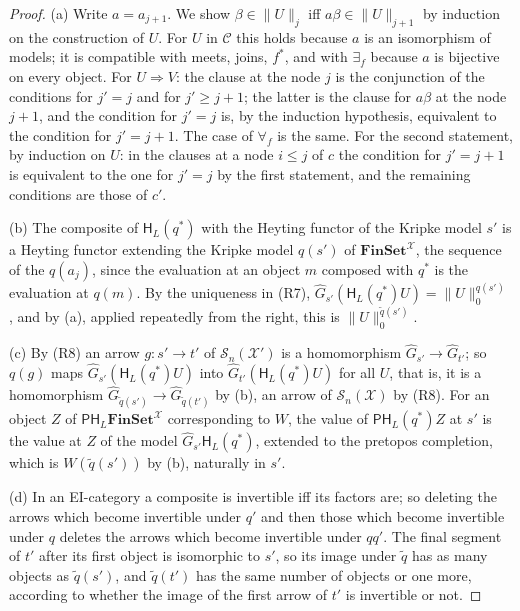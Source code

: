 \documentclass[11pt]{amsart}
\theoremstyle{definition}
\newcommand{\Fin}{\mathbf{FinSet}}
\newcommand{\PP}{\mathsf P}
\newcommand{\HH}{\mathsf H}
\newcommand{\cX}{\mathcal X}
\newcommand{\cC}{\mathcal C}
\newcommand{\cS}{\mathcal S}
\begin{document}
\begin{proof}
(a) Write $a=a_{j+1}$. We show $\beta\in\|U\|_j$ iff $a\beta\in
\|U\|_{j+1}$ by induction on the construction of $U$. For $U$ in $\cC$
this holds because $a$ is an isomorphism of models; it is compatible
with meets, joins, $f^*$, and with $\exists_f$ because $a$ is
bijective on every object. For $U\Rightarrow V$: the clause at the
node $j$ is the conjunction of the conditions for $j'=j$ and for
$j'\ge j+1$; the latter is the clause for $a\beta$ at the node $j+1$,
and the condition for $j'=j$ is, by the induction hypothesis,
equivalent to the condition for $j'=j+1$. The case of $\forall_f$ is
the same. For the second statement, by induction on $U$: in the
clauses at a node $i\le j$ of $c$ the condition for $j'=j+1$ is
equivalent to the one for $j'=j$ by the first statement, and the
remaining conditions are those of $c'$.

(b) The composite of $\HH_L(q^*)$ with the Heyting functor of the
Kripke model $s'$ is a Heyting functor extending the Kripke model
$q(s')$ of $\Fin^\cX$, the sequence of the $q(a_j)$, since the
evaluation at an object $m$ composed with $q^*$ is the evaluation at
$q(m)$. By the uniqueness in (R7), $\hat G_{s'}(\HH_L(q^*)U)=
\|U\|^{q(s')}_0$, and by (a), applied repeatedly from the right, this
is $\|U\|^{\tilde q(s')}_0$.

(c) By (R8) an arrow $g\colon s'\to t'$ of $\cS_n(\cX')$ is a
homomorphism $\hat G_{s'}\to\hat G_{t'}$; so $q(g)$ maps $\hat
G_{s'}(\HH_L(q^*)U)$ into $\hat G_{t'}(\HH_L(q^*)U)$ for all $U$, that
is, it is a homomorphism $\hat G_{\tilde q(s')}\to\hat G_{\tilde
q(t')}$ by (b), an arrow of $\cS_n(\cX)$ by (R8). For an object $Z$ of
$\PP\HH_L\Fin^\cX$ corresponding to $W$, the value of $\PP\HH_L(q^*)Z$
at $s'$ is the value at $Z$ of the model $\hat G_{s'}\HH_L(q^*)$,
extended to the pretopos completion, which is $W(\tilde q(s'))$ by
(b), naturally in $s'$.

(d) In an EI-category a composite is invertible iff its factors are;
so deleting the arrows which become invertible under $q'$ and then
those which become invertible under $q$ deletes the arrows which
become invertible under $qq'$. The final segment of $t'$ after its
first object is isomorphic to $s'$, so its image under $\tilde q$ has
as many objects as $\tilde q(s')$, and $\tilde q(t')$ has the same
number of objects or one more, according to whether the image of the
first arrow of $t'$ is invertible or not.
\end{proof}
\end{document}
